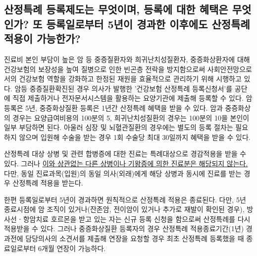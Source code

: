 \subsection{산정특례 등록제도는 무엇이며, 등록에 대한 혜택은 무엇인가? 또 등록일로부터 5년이 경과한 이후에도 산정특례 적용이 가능한가?}
진료비 본인 부담이 높은 암 등 중증질환자와 희귀난치성질환자, 중증화상환자에 대해 건강보험의 보장성을 높여 질병으로 인한 빈곤층 전락을 방지함으로써 사회안전망으로서의 건강보험 역할을 강화하고 한정된 재원을 효율적으로 관리하기 위해 시행하고 있다. 암등 중증질환 확진된 경우 의사가 발행한 '건강보험 산정특례 등록신청서'를 공단에 직접 제출하거나 전자문서시스템을 활용하는 요양기관에 제출해 등록할 수 있다. 암 등록은 5년, 중증화상질환 등록은 1년간 산정특례 혜택을 받을 수 있다. 
 암과 중증화상의 경우는 요양급여비용의 100분의 5, 희귀난치성질환의 경우는 100분의 10을 본인이 일부 부담하면 된다. 아울러 심장 및 뇌혈관질환의 경우에는 별도의 등록 절차는 필요하지 않으며 입원해 수술을 받는 경우 1회 수술당 최대 30일까지 혜택을 받을 수 있다.\par
산정특례 대상 상병 및 관련 합병증에 대한 진료는 특례대상으로 경감적용을 받을 수 있다. 그러나 \uline{이와 상관없는 다른 상병이나 기왕증에 의한 진료분은 해당되지 않는다.} 다만, 동일 진료과목(입원)의 동일 의사(외래)에게 해당 상병과 동시에 진료를 받는 경우 산정특례 적용을 받는다.\par
한편 등록일로부터 5년이 경과하면 원칙적으로 산정특례 적용은 종료된다. 다만, 5년 종료시점에 암 조직이 있거나(잔존암, 전이암이 있거나 추가로 재발이 확인된 경우), 방사선ㆍ항암치료 호르몬을 받고 있는 자는 신규 등록 신청을 함으로써 산정특례를 다시 적용받을 수 있다. 그러나 중증화상질환 등록자의 경우 산정특례 적용종료기간(1년) 경과전에 담당의사의 소견서를 제출해 연장을 요청할 경우 최초 산정특례 등록했을 때 종료일로부터 6개월 연장이 가능하다. 
